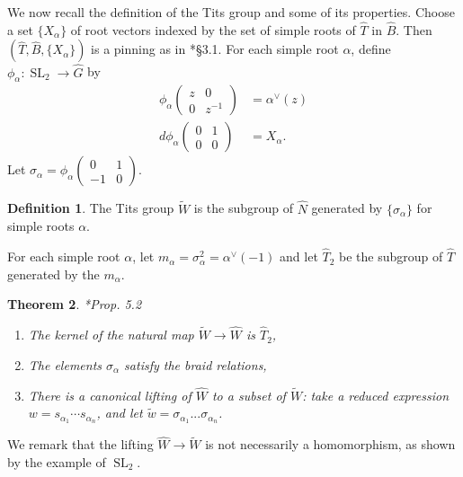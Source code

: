 \documentclass{mrlart7}
\theoremstyle{plain}
\newtheorem{theorem}{Theorem}[section]
\theoremstyle{definition}
\newtheorem{definition}[theorem]{Definition}
\numberwithin{equation}{section}
\DeclareMathOperator{\SL}{SL}
\begin{document}
We now recall the definition of
the Tits group and some of its properties.  Choose a set $\{ X_{\alpha} \}$ of root vectors
indexed by the set of simple roots of $\hat{T}$ in $\hat{B}$.  Then $(\hat{T}, \hat{B}, \{X_{\alpha} \})$
is a pinning as in \cite{reeder:10a}*{\S 3.1}.
For each simple root $\alpha$, define $\phi_{\alpha} : \SL_2 \rightarrow \hat{G}$
by
\begin{align*}
\phi_{\alpha}\begin{pmatrix}z & 0 \\ 0 & z^{-1}\end{pmatrix} &= \alpha^{\vee}(z) \\
d \phi_{\alpha}\begin{pmatrix}0 & 1 \\ 0 & 0\end{pmatrix} &= X_{\alpha}.
\end{align*}
Let $\sigma_{\alpha} = \phi_{\alpha}\begin{pmatrix}0 & 1 \\ -1 & 0\end{pmatrix}$.

\begin{definition}
  The Tits group $\widetilde{W}$ is the subgroup of $\hat{N}$
  generated by $\{\sigma_{\alpha} \}$ for simple roots $\alpha$.
\end{definition}

For each simple root $\alpha$, let $m_{\alpha} = \sigma_{\alpha}^2 = \alpha^{\vee}(-1)$ and
let $\hat{T}_2$ be the subgroup of $\hat{T}$ generated by the $m_{\alpha}$.

\begin{theorem}{\cite{adams-vogan:12}*{Prop. 5.2}}
\begin{enumerate}

\item The kernel of the natural map $\widetilde{W} \rightarrow \hat{W}$
  is $\hat{T}_2$,
\item The elements $\sigma_{\alpha}$ satisfy the braid relations,
\item There is a canonical lifting of $\hat{W}$ to a subset of
  $\widetilde{W}$: take a reduced expression $w = s_{\alpha_1} \cdots s_{\alpha_n}$,
  and let $\tilde{w} = \sigma_{\alpha_1} ... \sigma_{\alpha_n}$.
\end{enumerate}
\end{theorem}
We remark that the lifting $\hat{W} \rightarrow \widetilde{W}$ is not necessarily a homomorphism,
as shown by the example of $\SL_2$.
\end{document}
